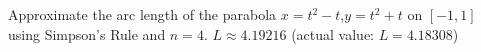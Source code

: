 {Approximate the arc length of the  parabola $x=t^2-t$,\quad  $y=t^2+t$ on $[-1,1]$ using Simpson's Rule and $n=4$.}
{$L\approx 4.19216$ (actual value: $L=4.18308$) }

